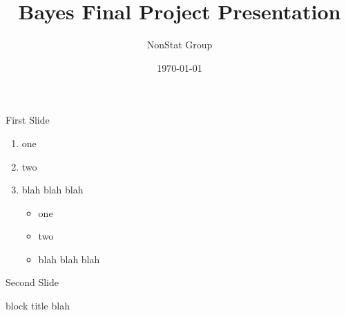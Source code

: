 \documentclass{beamer}
\title[Final Presentation]{Bayes Final Project Presentation}
\author[NonStat]{NonStat Group}
\date{\today}
\begin{document}
\begin{frame}
\titlepage
\end{frame}


\begin{frame}{First Slide}

\begin{enumerate}
\item one
\item two
\item blah blah blah

\begin{itemize}
\item one
\item two
\item blah blah blah

\end{itemize}

\end{enumerate}

\end{frame}





\begin{frame}{Second Slide}
\begin{block}{block title}
blah
\end{block}
\end{frame}
\end{document}

